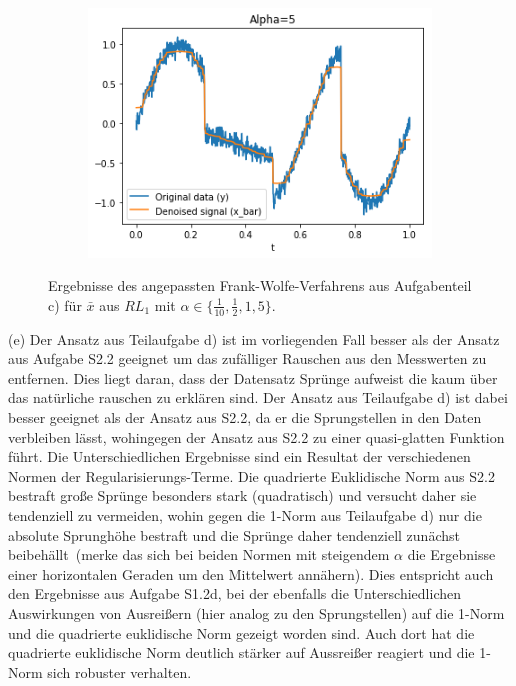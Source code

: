 \documentclass[ngerman, a4paper,12pt]{article}
\begin{document}
\begin{figure}[h]
\begin{subfigure}[b]{0.45\textwidth}
		\label{3a1}
	\end{subfigure}
	\begin{subfigure}[b]{0.45\textwidth}
		\includegraphics[width=1\columnwidth]{Images/3a5.png}
		\label{3a5}
	\end{subfigure}
	\caption{Ergebnisse des angepassten Frank-Wolfe-Verfahrens aus Aufgabenteil c) für $\bar{x}$ aus $RL_1$ mit $\alpha \in \{\frac{1}{10}, \frac{1}{2}, 1, 5\}$.}
	\vspace{-20pt}
\end{figure}
\par
(e) Der Ansatz aus Teilaufgabe d) ist im vorliegenden Fall besser als der Ansatz aus Aufgabe S2.2 geeignet um das zufälliger Rauschen aus den Messwerten zu entfernen. Dies liegt daran, dass der Datensatz Sprünge aufweist die kaum über das natürliche rauschen zu erklären sind. Der Ansatz aus Teilaufgabe d) ist dabei besser geeignet als der Ansatz aus S2.2, da er die Sprungstellen in den Daten verbleiben lässt, wohingegen der Ansatz aus S2.2 zu einer quasi-glatten Funktion führt. Die Unterschiedlichen Ergebnisse sind ein Resultat der verschiedenen Normen der Regularisierungs-Terme. Die quadrierte Euklidische Norm aus S2.2 bestraft große Sprünge besonders stark (quadratisch) und versucht daher sie tendenziell \glqq zu vermeiden\grqq, wohin gegen die 1-Norm aus Teilaufgabe d) nur die absolute Sprunghöhe bestraft und die Sprünge daher tendenziell zunächst \glqq beibehällt\grqq ~(merke das sich bei beiden Normen mit steigendem $\alpha$ die Ergebnisse einer horizontalen Geraden um den Mittelwert annähern). Dies entspricht auch den Ergebnisse aus Aufgabe S1.2d, bei der ebenfalls die Unterschiedlichen Auswirkungen von Ausreißern (hier analog zu den Sprungstellen) auf die 1-Norm und die quadrierte euklidische Norm gezeigt worden sind. Auch dort hat die quadrierte euklidische Norm deutlich stärker auf Aussreißer reagiert und die 1-Norm sich robuster verhalten.
\par
\end{document}
